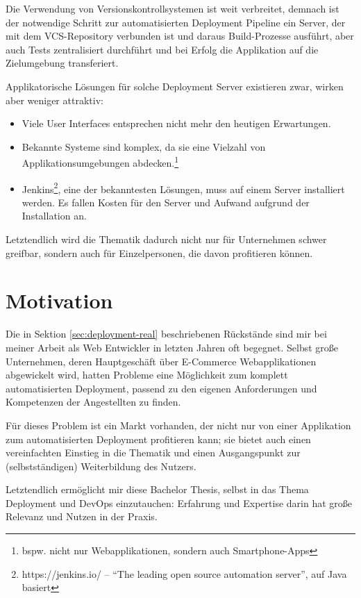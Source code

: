 \documentclass{scrartcl}
\begin{document}
Die Verwendung von Versionskontrollsystemen ist weit verbreitet, demnach ist der notwendige Schritt zur automatisierten Deployment Pipeline ein Server, der mit dem VCS-Repository verbunden ist und daraus Build-Prozesse ausführt, aber auch Tests zentralisiert durchführt und bei Erfolg die Applikation auf die Zielumgebung transferiert.

Applikatorische Lösungen für solche Deployment Server existieren zwar, wirken aber weniger attraktiv:

\begin{itemize}
  \item Viele User Interfaces entsprechen nicht mehr den heutigen Erwartungen.
  \item Bekannte Systeme sind komplex, da sie eine Vielzahl von Applikationsumgebungen abdecken.\footnote{bspw. nicht nur Webapplikationen, sondern auch Smartphone-Apps}
  \item Jenkins\footnote{https://jenkins.io/ – ``The leading open source automation server'', auf Java basiert}, eine der bekanntesten Lösungen, muss auf einem Server installiert werden. Es fallen Kosten für den Server und Aufwand aufgrund der Installation an.
\end{itemize}

Letztendlich wird die Thematik dadurch nicht nur für Unternehmen schwer greifbar, sondern auch für Einzelpersonen, die davon profitieren können.

\section{Motivation}

Die in Sektion \ref{sec:deployment-real} beschriebenen Rückstände sind mir bei meiner Arbeit als Web Entwickler in letzten Jahren oft begegnet. Selbst große Unternehmen, deren Hauptgeschäft über E-Commerce Webapplikationen abgewickelt wird, hatten Probleme eine Möglichkeit zum komplett automatisierten Deployment, passend zu den eigenen Anforderungen und Kompetenzen der Angestellten zu finden.

Für dieses Problem ist ein Markt vorhanden, der nicht nur von einer Applikation zum automatisierten Deployment profitieren kann; sie bietet auch einen vereinfachten Einstieg in die Thematik und einen Ausgangspunkt zur (selbstständigen) Weiterbildung des Nutzers.

Letztendlich ermöglicht mir diese Bachelor Thesis, selbst in das Thema Deployment und Dev\-Ops einzutauchen: Erfahrung und Expertise darin hat große Relevanz und Nutzen in der Praxis.
\end{document}
